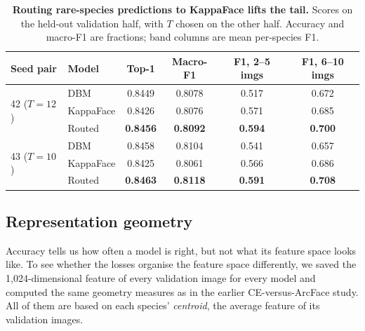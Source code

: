 \documentclass[11pt]{article}
\begin{document}
\begin{table}[t]
\centering
\small
\caption{\textbf{Routing rare-species predictions to KappaFace lifts the tail.} Scores
on the held-out validation half, with $T$ chosen on the other half. Accuracy and
macro-F1 are fractions; band columns are mean per-species F1.}
\label{tab:routing}
\footnotesize
\begin{tabular}{@{}llcccc@{}}
\toprule
Seed pair & Model & Top-1 & Macro-F1 & F1, 2--5 imgs & F1, 6--10 imgs \\
\midrule
\multirow{3}{*}{42 ($T=12$)} & DBM       & 0.8449 & 0.8078 & 0.517 & 0.672 \\
                             & KappaFace & 0.8426 & 0.8076 & 0.571 & 0.685 \\
                             & Routed    & \textbf{0.8456} & \textbf{0.8092} & \textbf{0.594} & \textbf{0.700} \\
\midrule
\multirow{3}{*}{43 ($T=10$)} & DBM       & 0.8458 & 0.8104 & 0.541 & 0.657 \\
                             & KappaFace & 0.8425 & 0.8061 & 0.566 & 0.686 \\
                             & Routed    & \textbf{0.8463} & \textbf{0.8118} & \textbf{0.591} & \textbf{0.708} \\
\bottomrule
\end{tabular}
\end{table}

\subsection{Representation geometry}
\label{sec:res-geom}

Accuracy tells us how often a model is right, but not what its feature space looks like.
To see whether the losses organise the feature space differently, we saved the
1{,}024-dimensional feature of every validation image for every model and computed the
same geometry measures as in the earlier CE-versus-ArcFace study. All of them are based
on each species' \emph{centroid}, the average feature of its validation images.
\end{document}
